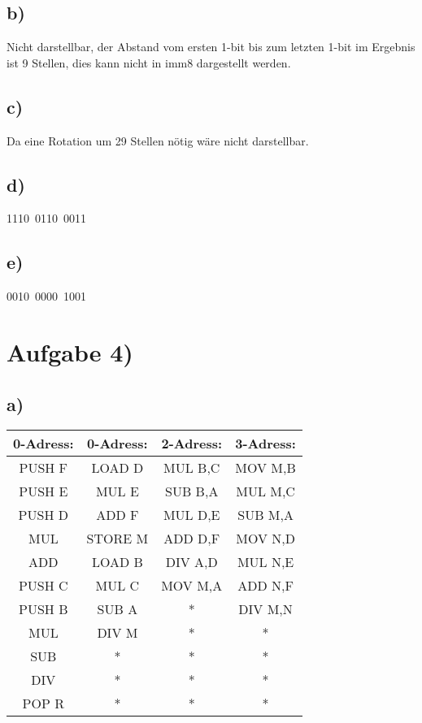 \documentclass[a4paper]{scrartcl}
\begin{document}
	\subsection{b)} Nicht darstellbar, der Abstand vom ersten 1-bit bis zum letzten 1-bit im
	 Ergebnis ist 9 Stellen, dies kann nicht in imm8 dargestellt werden.

	\subsection{c)} Da eine Rotation um 29 Stellen nötig wäre nicht darstellbar.

	\subsection{d)} 1110\ 0110\ 0011

	\subsection{e)} 0010\ 0000\ 1001

\section{Aufgabe 4)}
	\subsection{a)}
		\begin{center}
			\begin{tabular}{|c|c|c|c|}
				\hline
				0-Adress: & 0-Adress: & 2-Adress: & 3-Adress:\\ \hline
				PUSH F & LOAD D		& MUL B,C & MOV M,B \\
				PUSH E & MUL E		& SUB B,A & MUL M,C \\
				PUSH D & ADD F  	& MUL D,E & SUB M,A \\
				MUL	   & STORE M	& ADD D,F & MOV N,D \\
				ADD	   & LOAD B		& DIV A,D & MUL N,E \\
				PUSH C & MUL C		& MOV M,A & ADD N,F \\
				PUSH B & SUB A		&	 * 	  &	DIV M,N \\
				MUL	   & DIV M		&	 *    &     *   \\
				SUB	   &     *		&	 *    &     *   \\						
				DIV	   &     *		&	 *    &     *   \\						
				POP R  &     *		&	 *    &     *   \\ \hline
			\end{tabular}
		\end{center}				 
		
\end{document}
